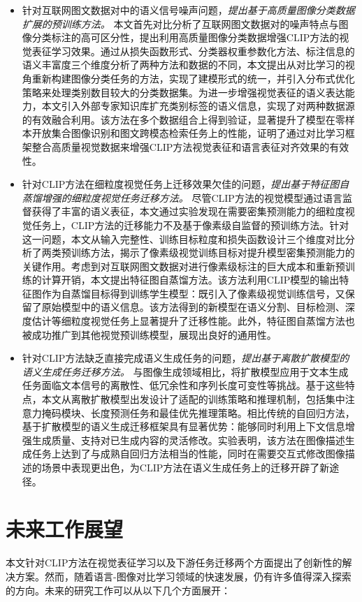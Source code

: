 \begin{itemize}
    \item 针对互联网图文数据对中的语义信号噪声问题，\textit{提出基于高质量图像分类数据扩展的预训练方法。} 本文首先对比分析了互联网图文数据对的噪声特点与图像分类标注的高可区分性，提出利用高质量图像分类数据增强CLIP方法的视觉表征学习效果。通过从损失函数形式、分类器权重参数化方法、标注信息的语义丰富度三个维度分析了两种方法和数据的不同，本文提出从对比学习的视角重新构建图像分类任务的方法，实现了建模形式的统一，并引入分布式优化策略来处理类别数目较大的分类数据集。为进一步增强视觉表征的语义表达能力，本文引入外部专家知识库扩充类别标签的语义信息，实现了对两种数据源的有效融合利用。该方法在多个数据组合上得到验证，显著提升了模型在零样本开放集合图像识别和图文跨模态检索任务上的性能，证明了通过对比学习框架整合高质量视觉数据来增强CLIP方法视觉表征和语言表征对齐效果的有效性。
    \item 针对CLIP方法在细粒度视觉任务上迁移效果欠佳的问题，\textit{提出基于特征图自蒸馏增强的细粒度视觉任务迁移方法。} 尽管CLIP方法的视觉模型通过语言监督获得了丰富的语义表征，本文通过实验发现在需要密集预测能力的细粒度视觉任务上，CLIP方法的迁移能力不及基于像素级自监督的预训练方法。针对这一问题，本文从输入完整性、训练目标粒度和损失函数设计三个维度对比分析了两类预训练方法，揭示了像素级视觉训练目标对提升模型密集预测能力的关键作用。考虑到对互联网图文数据对进行像素级标注的巨大成本和重新预训练的计算开销，本文提出特征图自蒸馏方法。该方法利用CLIP模型的输出特征图作为自蒸馏目标得到训练学生模型：既引入了像素级视觉训练信号，又保留了原始模型中的语义信息。该方法得到的新模型在语义分割、目标检测、深度估计等细粒度视觉任务上显著提升了迁移性能。此外，特征图自蒸馏方法也被成功推广到其他视觉预训练模型，展现出良好的通用性。
    \item 针对CLIP方法缺乏直接完成语义生成任务的问题，\textit{提出基于离散扩散模型的语义生成任务迁移方法。} 与图像生成领域相比，将扩散模型应用于文本生成任务面临文本信号的离散性、低冗余性和序列长度可变性等挑战。基于这些特点，本文从离散扩散模型出发设计了适配的训练策略和推理机制，包括集中注意力掩码模块、长度预测任务和最佳优先推理策略。相比传统的自回归方法，基于扩散模型的语义生成迁移框架具有显著优势：能够同时利用上下文信息增强生成质量、支持对已生成内容的灵活修改。实验表明，该方法在图像描述生成任务上达到了与成熟自回归方法相当的性能，同时在需要交互式修改图像描述的场景中表现更出色，为CLIP方法在语义生成任务上的迁移开辟了新途径。
\end{itemize}

\section{未来工作展望}
本文针对CLIP方法在视觉表征学习以及下游任务迁移两个方面提出了创新性的解决方案。然而，随着语言-图像对比学习领域的快速发展，仍有许多值得深入探索的方向。未来的研究工作可以从以下几个方面展开：
